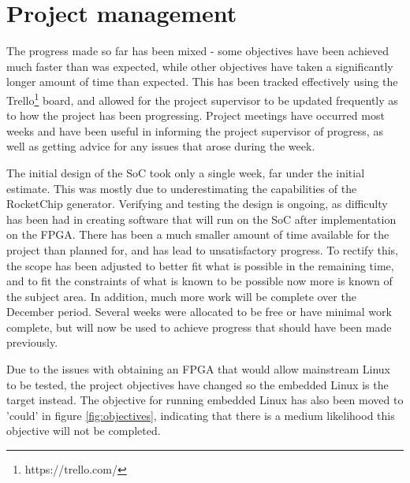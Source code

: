 \section{Project management}
The progress made so far has been mixed - some objectives have been achieved much faster than was expected, while other objectives have taken a significantly longer amount of time than expected. This has been tracked effectively using the Trello\footnote{https://trello.com/} board, and allowed for the project supervisor to be updated frequently as to how the project has been progressing. Project meetings have occurred most weeks and have been useful in informing the project supervisor of progress, as well as getting advice for any issues that arose during the week.

The initial design of the SoC took only a single week, far under the initial estimate. This was mostly due to underestimating the capabilities of the RocketChip generator. Verifying and testing the design is ongoing, as difficulty has been had in creating software that will run on the SoC after implementation on the FPGA. There has been a much smaller amount of time available for the project than planned for, and has lead to unsatisfactory progress. To rectify this, the scope has been adjusted to better fit what is possible in the remaining time, and to fit the constraints of what is known to be possible now more is known of the subject area. In addition, much more work will be complete over the December period. Several weeks were allocated to be free or have minimal work complete, but will now be used to achieve progress that should have been made previously.

Due to the issues with obtaining an FPGA that would allow mainstream Linux to be tested, the project objectives have changed so the embedded Linux is the target instead. The objective for running embedded Linux has also been moved to 'could' in figure \ref{fig:objectives}, indicating that there is a medium likelihood this objective will not be completed.

